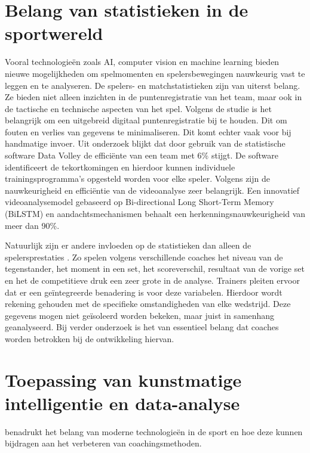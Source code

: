 \section{Belang van statistieken in de sportwereld}
Vooral technologieën zoals AI, computer vision en machine learning bieden nieuwe mogelijkheden om spelmomenten en spelersbewegingen nauwkeurig vast te leggen en te analyseren. De spelers- en matchstatistieken \autocite{Wahyuti2023} zijn van uiterst belang. Ze bieden niet alleen inzichten in de puntenregistratie van het team, maar ook in de tactische en technische aspecten van het spel. Volgens de studie is het belangrijk om een uitgebreid digitaal puntenregistratie bij te houden. Dit om fouten en verlies van gegevens te minimaliseren. Dit komt echter vaak voor bij handmatige invoer. Uit onderzoek \autocite{Harabagiu2023} blijkt dat door gebruik van de statistische software Data Volley de efficiënte van een team met 6\% stijgt. De software identificeert de tekortkomingen en hierdoor kunnen individuele trainingsprogramma's opgesteld worden voor elke speler. Volgens \textcite{Ruiye2024} zijn de nauwkeurigheid en efficiëntie van de videoanalyse zeer belangrijk. Een innovatief videoanalysemodel gebaseerd op Bi-directional Long Short-Term Memory (BiLSTM) en aandachtsmechanismen behaalt een herkenningsnauwkeurigheid van meer dan 90\%.

Natuurlijk zijn er andere invloeden op de statistieken dan alleen de spelersprestaties \autocite{LopezSerrano2022}. Zo spelen volgens verschillende coaches het niveau van de tegenstander, het moment in een set, het scoreverschil, resultaat van de vorige set en het de competitieve druk een zeer grote in de analyse. Trainers pleiten ervoor dat er een geïntegreerde benadering is voor deze variabelen. Hierdoor wordt rekening gehouden met de specifieke omstandigheden van elke wedstrijd. Deze gegevens mogen niet geïsoleerd worden bekeken, maar juist in samenhang geanalyseerd. Bij verder onderzoek is het van essentieel belang dat coaches worden betrokken bij de ontwikkeling hiervan.

\section{Toepassing van kunstmatige intelligentie en data-analyse}
\textcite{Fadl2020} benadrukt het belang van moderne technologieën in de sport en hoe deze kunnen bijdragen aan het verbeteren van coachingsmethoden.

